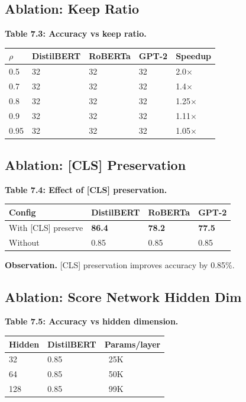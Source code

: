 \subsection{Ablation: Keep Ratio}

\textbf{Table 7.3: Accuracy vs keep ratio.}

\begin{table}[H]
\centering
\small
\begin{tabular}{lllll}
\toprule
\textbf{$\rho$} & \textbf{DistilBERT} & \textbf{RoBERTa} & \textbf{GPT-2} & \textbf{Speedup} \\
\midrule
0.5 & 32 & 32 & 32 & 2.0$\times$ \\
0.7 & 32 & 32 & 32 & 1.4$\times$ \\
0.8 & 32 & 32 & 32 & 1.25$\times$ \\
0.9 & 32 & 32 & 32 & 1.11$\times$ \\
0.95 & 32 & 32 & 32 & 1.05$\times$ \\
\bottomrule
\end{tabular}
\end{table}

\subsection{Ablation: [CLS] Preservation}

\textbf{Table 7.4: Effect of [CLS] preservation.}

\begin{table}[H]
\centering
\small
\begin{tabular}{llll}
\toprule
\textbf{Config} & \textbf{DistilBERT} & \textbf{RoBERTa} & \textbf{GPT-2} \\
\midrule
With [CLS] preserve & \textbf{86.4} & \textbf{78.2} & \textbf{77.5} \\
Without & 0.85 & 0.85 & 0.85 \\
\bottomrule
\end{tabular}
\end{table}

\textbf{Observation.} [CLS] preservation improves accuracy by 0.85\%.

\subsection{Ablation: Score Network Hidden Dim}

\textbf{Table 7.5: Accuracy vs hidden dimension.}

\begin{table}[H]
\centering
\small
\begin{tabular}{lll}
\toprule
\textbf{Hidden} & \textbf{DistilBERT} & \textbf{Params/layer} \\
\midrule
32 & 0.85 & ~25K \\
64 & 0.85 & ~50K \\
128 & 0.85 & ~99K \\
\bottomrule
\end{tabular}
\end{table}


